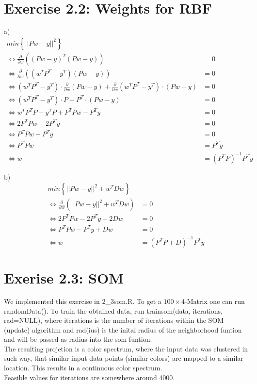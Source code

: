 \documentclass{scrartcl}
\begin{document}
\section{Exercise 2.2: Weights for RBF}

a)
\begin{align*}
  min \left\{ || P w-y ||^2\right\} &\\
 \Leftrightarrow  \frac{\partial}{\partial w} \left( (P w-y)^T (P w-y)\right) & = 0 \\
 \Leftrightarrow  \frac{\partial}{\partial w} \left( (w^T P^T -y^T) (P w-y)\right) & = 0 \\
 \Leftrightarrow  (w^T P^T -y^T) \cdot \frac{\partial}{\partial w} \left( P w-y\right) + \frac{\partial}{\partial w} \left( w^T P^T -y^T \right) \cdot (P w-y) & = 0 \\
 \Leftrightarrow  (w^T P^T -y^T) \cdot  P + P^T \cdot (P w-y) & = 0 \\
 \Leftrightarrow  w^T P^T P - y^T P + P^T P w - P^T y & = 0  \\
 \Leftrightarrow  2 P^T P w - 2 P^T y & = 0 \\
 \Leftrightarrow  P^T P w - P^T y & = 0 \\
 \Leftrightarrow  P^T P w & = P^T y \\
 \Leftrightarrow w & = (P^T P)^{-1} P^T y
\end{align*}

b)
\begin{align*}
      min \left\{ || P w-y ||^2 + w^T D w \right\} &\\
     \Leftrightarrow  \frac{\partial}{\partial w} \left(|| P w-y ||^2 + w^T D w\right) & = 0 \\
     \Leftrightarrow  2 P^T P w - 2 P^T y + 2 D w & = 0 \\
     \Leftrightarrow  P^T P w - P^T y + D w& = 0 \\
     \Leftrightarrow w & = (P^T P + D)^{-1} P^T y
\end{align*}


\section{Exerise 2.3: SOM}
We implemented this exercise in 2\_3som.R. To get a $100\times4$-Matrix one can run randomData(). To train the obtained data, run trainsom(data, iterations, rad=NULL), where iterations is the number of iterations within the SOM (update) algorithm and rad(ius) is the inital radius of the neighborhood funtion and will be passed as radius into the som funtion. \\
The resulting projetion is a color spectrum, where the input data was clustered in such way, that similar input data points (similar colors) are mapped to a similar location. This results in a continuous color spectrum. \\
Feasible values for iterations are somewhere around 4000. 
\end{document}
